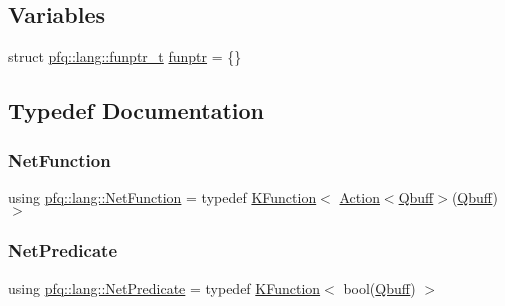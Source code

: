 \subsection*{Variables}
\begin{DoxyCompactItemize}
\item 
struct \hyperlink{structpfq_1_1lang_1_1funptr__t}{pfq\+::lang\+::funptr\+\_\+t} \hyperlink{namespacepfq_1_1lang_a8d957b8f6df7198413d3ff9bd698e682}{funptr} = \{\}
\end{DoxyCompactItemize}


\subsection{Typedef Documentation}
\mbox{\label{namespacepfq_1_1lang_aa68bcd4318570ab85efa3d1aa4c997eb}} 
\subsubsection{\texorpdfstring{Net\+Function}{NetFunction}}
{\footnotesize\ttfamily using \hyperlink{namespacepfq_1_1lang_aa68bcd4318570ab85efa3d1aa4c997eb}{pfq\+::lang\+::\+Net\+Function} = typedef \hyperlink{structpfq_1_1lang_1_1KFunction}{K\+Function}$<$ \hyperlink{structpfq_1_1lang_1_1Action}{Action}$<$\hyperlink{structpfq_1_1lang_1_1Qbuff}{Qbuff}$>$(\hyperlink{structpfq_1_1lang_1_1Qbuff}{Qbuff}) $>$}

\mbox{\label{namespacepfq_1_1lang_a81905bab0f0cbcdb83d62b840af6943e}} 
\subsubsection{\texorpdfstring{Net\+Predicate}{NetPredicate}}
{\footnotesize\ttfamily using \hyperlink{namespacepfq_1_1lang_a81905bab0f0cbcdb83d62b840af6943e}{pfq\+::lang\+::\+Net\+Predicate} = typedef \hyperlink{structpfq_1_1lang_1_1KFunction}{K\+Function}$<$ bool(\hyperlink{structpfq_1_1lang_1_1Qbuff}{Qbuff}) $>$}

\mbox{\label{namespacepfq_1_1lang_a0c784c3d4623b8b9fd1d8fd8f67a4854}} 
